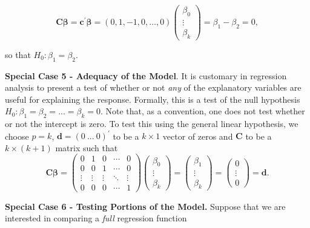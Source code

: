 \begin{equation*}
\mathbf{C \boldsymbol \beta = c^{\prime} \boldsymbol \beta}=
\left(0,1, -1, 0, \ldots, 0\right) \left(
\begin{array}{c}
\beta _0 \\
\vdots  \\
\beta _k
\end{array}
\right) =\beta_1 - \beta_2 = 0,
\end{equation*}

\noindent so that $H_{0}: \beta_1 = \beta_2.$


\textbf{Special Case 5 - Adequacy of the Model}. It is customary in
regression analysis to present a test of whether or not \emph{any}
of the explanatory variables are useful for explaining the response.
Formally, this is a test of the null hypothesis $H_{0}:\beta
_{1}=\beta _{2}=...=\beta _{k}=0$. Note that, as a convention, one
does not test whether or not the intercept
is zero. To test this using the general linear hypothesis, we choose $p=k$, $%
\mathbf{d=}\left( 0~...~0\right) ^{\prime }$ to be a $k\times 1$
vector of zeros and $\mathbf{C}$ to be a $k\times (k+1)$ matrix such
that
\begin{equation*}
\mathbf{C \boldsymbol \beta =}\left(
\begin{array}{ccccc}
0 & 1 & 0 & \cdots  & 0 \\
0 & 0 & 1 & \cdots  & 0 \\
\vdots  & \vdots  & \vdots  & \ddots  & \vdots  \\
0 & 0 & 0 & \cdots  & 1%
\end{array}%
\right) \left(
\begin{array}{c}
\beta _{0} \\
\vdots  \\
\beta _{k}%
\end{array}%
\right) =\left(
\begin{array}{c}
\beta _{1} \\
\vdots  \\
\beta _{k}%
\end{array}%
\right)  =\left(
\begin{array}{c}
0 \\
\vdots  \\
0
\end{array}%
\right) =\mathbf{d}.
\end{equation*}


\textbf{Special Case 6 - Testing Portions of the Model.} Suppose
that we are interested in comparing a \emph{full} regression
function

